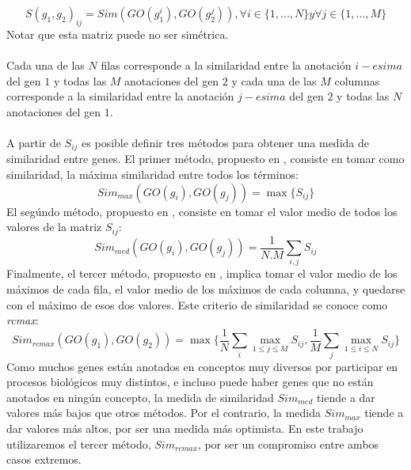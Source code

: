 \begin{equation}
	S(g_1, g_2)_{ij} = Sim(GO(g_1^i), GO(g_2^j)), \forall i \in \{1,...,N\} y \forall j \in \{1,...,M\}
\end{equation}
Notar que esta matriz puede no ser simétrica.\\\\
Cada una de las $N$ filas corresponde a la similaridad entre la anotación $i-esima$ del gen $1$ y todas las $M$ anotaciones del gen $2$ y cada una de las $M$ columnas corresponde a la similaridad entre la anotación $j-esima$ del gen $2$ y todas las $N$ anotaciones del gen $1$.\\\\
A partir de $S_{ij}$ es posible definir tres métodos para obtener una medida de similaridad entre genes.
El primer método, propuesto en \cite{Sevilla2005}, consiste en tomar como similaridad, la máxima similaridad entre todos los términos:
\begin{equation}
	Sim_{max}(GO(g_i), GO(g_j)) = \max\{S_{ij}\}
\end{equation}
El segúndo método, propuesto en \cite{Lord2003}, consiste en tomar el valor medio de todos los valores de la matriz $S_{ij}$:
\begin{equation}
	Sim_{med}(GO(g_i), GO(g_j)) = \frac{1}{N.M}\sum\limits_{i,j}S_{ij}
\end{equation}
Finalmente, el tercer método, propuesto en \cite{Pesquita2009}, implica tomar el valor medio de los máximos de cada fila, el valor medio de los máximos de cada columna, y quedarse con el máximo de esos dos valores. Este criterio de similaridad se conoce como \textit{rcmax}:
\begin{equation}
	Sim_{rcmax}(GO(g_1), GO(g_2)) = \max\{\frac{1}{N}\sum\limits_{i}\max\limits_{1\leq j \leq M}S_{ij}, \frac{1}{M}\sum\limits_{j}\max\limits_{1\leq i \leq N}S_{ij}\}
	\label{eq:sim_rcmax}
\end{equation}
Como muchos genes están anotados en conceptos muy diversos por participar en procesos biológicos muy distintos, e incluso puede haber genes que no están anotados en ningún concepto, la medida de similaridad $Sim_{med}$ tiende a dar valores más bajos que otros métodos. Por el contrario, la medida $Sim_{max}$ tiende a dar valores más altos, por ser una medida más optimista. En este trabajo utilizaremos el tercer método, $Sim_{rcmax}$, por ser un compromiso entre ambos casos extremos.
\cite{Resnik1995, Pesquita2009, Bose2016, Lin1998, Jiang1997, Sevilla2005, Lord2003}

